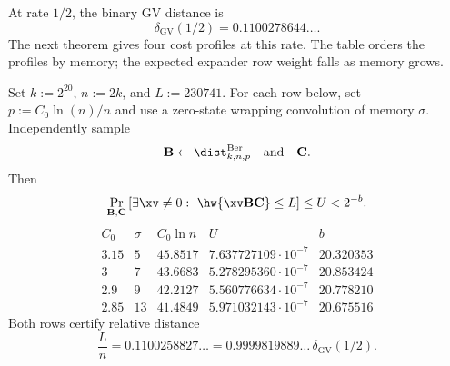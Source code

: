 At rate $1/2$, the binary GV distance is
\[
 \delta_{\mathrm{GV}}(1/2)=0.1100278644\ldots.
\]
The next theorem gives four cost profiles at this rate.  The table orders the
profiles by memory; the expected expander row weight falls as memory grows.

\begin{theorem}
\label{thm:wrapped-ec-certified-rate-half-gv}
Set $k:=2^{20}$, $n:=2k$, and $L:=230741$.  For each row below, set
$p:=C_0\ln(n)/n$ and use a zero-state wrapping convolution of memory
$\sigma$.  Independently sample
\[
 \B\gets\dist^{\mathrm{Ber}}_{k,n,p}
 \quad\text{and}\quad \C.
\]
Then
\[
 \Pr_{\B,\C}\left[
  \exists\xv\neq0:\ \hw{\xv\B\C}\leq L
 \right]\leq U<2^{-b}.
\]
\[
\begin{array}{c|c|c|c|c}
C_0&\sigma&C_0\ln n&U&b\\ \hline
3.15&5&45.8517&7.637727109\mathbin{\cdot}10^{-7}&20.320353\\
3&7&43.6683&5.278295360\mathbin{\cdot}10^{-7}&20.853424\\
2.9&9&42.2127&5.560776634\mathbin{\cdot}10^{-7}&20.778210\\
2.85&13&41.4849&5.971032143\mathbin{\cdot}10^{-7}&20.675516
\end{array}
\]
Both rows certify relative distance
\[
 \frac{L}{n}=0.1100258827\ldots
 =0.9999819889\ldots\,\delta_{\mathrm{GV}}(1/2).
\]
\end{theorem}

